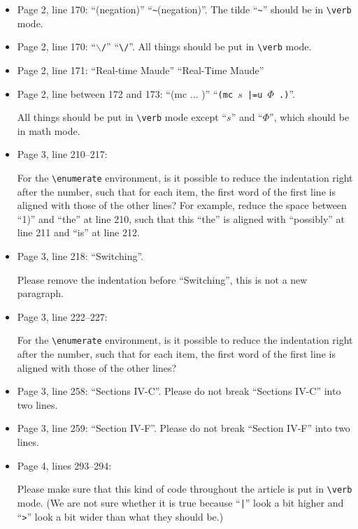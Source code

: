\documentclass[12pt,onecolumn]{IEEEtranTIE}
\begin{document}
\begin{itemize}
\item Page 2, line 170: ``(negation)'' \by ``\verb|~|(negation)''. The
  tilde ``\verb|~|'' should be in \verb|\verb| mode.

\item Page 2, line 170: ``$\backslash$\verb|/|'' \by ``\verb|\/|''. All
  things should be put in \verb|\verb| mode.

\item Page 2, line 171: ``Real-time Maude'' \by ``Real-Time Maude''

\item Page 2, line between 172 and 173: ``(mc ... )'' \by
  ``\verb|(mc |$s$\verb+ |=u +$\Phi$\verb| .)|''.

All things should be put in \verb|\verb| mode except ``$s$'' and
``$\Phi$'', which should be in math mode.

\item Page 3, line 210--217:

For the \verb|\enumerate| environment, is it possible to reduce the
indentation right after the number, such that for each item, the first
word of the first line is aligned with those of the other lines? For
example, reduce the space between ``1)'' and ``the'' at line 210, such
that this ``the'' is aligned with ``possibly'' at line 211 and ``is''
at line 212.

\item Page 3, line 218: ``Switching''.

Please remove the indentation before ``Switching'', this is not a new
paragraph.

\item Page 3, line 222--227:

For the \verb|\enumerate| environment, is it possible to reduce the
indentation right after the number, such that for each item, the first
word of the first line is aligned with those of the other lines? 

\item Page 3, line 258: ``Sections IV-C''. Please do not break
  ``Sections IV-C'' into two lines.

\item Page 3, line 259: ``Section IV-F''. Please do not break
  ``Section IV-F'' into two lines.

\item Page 4, lines 293--294:

Please make sure that this kind of code throughout the article is put
in \verb|\verb| mode. (We are not sure whether it is true because
``\verb+|+'' look a bit higher and ``\verb|>|'' look a bit wider than
what they should be.)


\end{itemize}
\end{document}
